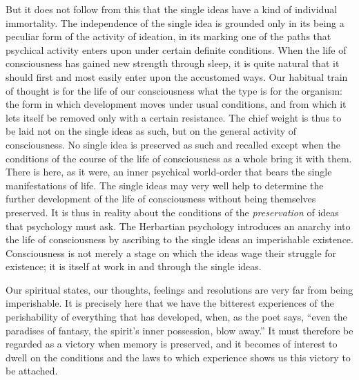 \documentclass[12pt,a4paper]{book}
\newcommand{\opage}[1]{\marginnote{\footnotesize\textit{[#1]}}}
\begin{document}
But it does not follow from this that the single ideas have a kind of
individual immortality. The independence of the single idea is grounded
only in its being a peculiar form of the activity of ideation, in its
marking one of the paths that psychical activity enters upon under
certain definite conditions. When the life of consciousness has gained new
strength through sleep, it is quite natural that it should first and most
easily enter upon the accustomed ways. Our habitual train of thought is
for the life of our consciousness what the type is for the organism: the
form in which development moves under usual conditions, and from which it
lets itself be removed only with a certain resistance. The chief weight is
thus to be laid not on the single ideas as such, but on the general
activity of consciousness. No single idea is preserved as such and
recalled except when the conditions of the course of the life of
consciousness as a whole bring it with them. There is here, as it were,
an inner psychical world-order that bears the single manifestations of
life. The single ideas may very well help to determine the further
development of the life of consciousness without being themselves
preserved. It is thus in reality about the conditions of the
\emph{preservation} of ideas that psychology must ask. The Herbartian
psychology introduces an anarchy into the life of consciousness by
ascribing to the single ideas an imperishable existence. Consciousness is
not merely a stage on which the ideas wage their struggle for existence;
it is itself at work in and through the single ideas.

Our spiritual states, our thoughts, feelings and resolutions are very far
from being imperishable. It is
\opage{176}precisely here that we have the bitterest experiences of the
perishability of everything that has developed, when, as the poet says,
``even the paradises of fantasy, the spirit's inner possession, blow
away.'' It must therefore be regarded as a victory when memory is
preserved, and it becomes of interest to dwell on the conditions and the
laws to which experience shows us this victory to be attached.
\end{document}

